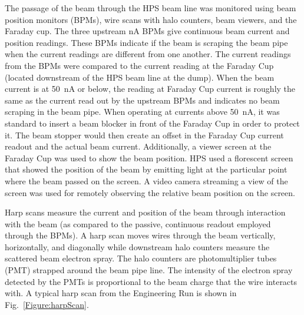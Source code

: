 \documentclass[12pt]{report}
\begin{document}
The passage of the beam through the HPS beam line was monitored using beam position monitors (BPMs), wire scans with halo counters, beam viewers, and the Faraday cup. The three upstream nA BPMs give continuous beam current and position readings. These BPMs indicate if the beam is scraping the beam pipe when the current readings are different from one another. The current readings from the BPMs were compared to the current reading at the Faraday Cup (located downstream of the HPS beam line at the dump). When the beam current is at 50~nA or below, the reading at Faraday Cup current is roughly the same as the current read out by the upstream BPMs and indicates no beam scraping in the beam pipe. When operating at currents above 50~nA, it was standard to insert a beam blocker in front of the Faraday Cup in order to protect it. The beam stopper would then create an offset in the Faraday Cup current readout and the actual beam current. Additionally, a viewer screen at the Faraday Cup was used to show the beam position. HPS used a florescent screen that showed the position of the beam by emitting light at the particular point where the beam passed on the screen. A video camera streaming a view of the screen was used for remotely observing the relative beam position on the screen.  

Harp scans measure the current and position of the beam through interaction with the beam (as compared to the passive, continuous readout employed through the BPMs). A harp scan moves wires through the beam vertically, horizontally, and diagonally while  downstream halo counters measure the scattered beam electron spray. The halo counters are photomultiplier tubes (PMT) strapped around the beam pipe line. The intensity of the electron spray detected by the PMTs is proportional to the beam charge that the wire interacts with. A typical harp scan from the Engineering Run is shown in Fig.~\ref{Figure:harpScan}.
\end{document}
